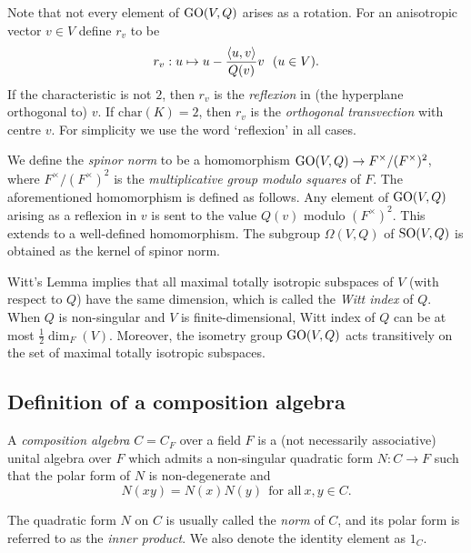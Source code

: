 Note that not every element of $\mathrm{GO}(V,Q)$ arises as a rotation. For an anisotropic
vector $v \in V$ define $r_v$ to be 
\begin{equation}
	\label{eq:reflection}
	r_v: u \mapsto u - \frac{\langle u, v \rangle}{Q(v)} v\ \ (u \in V).
\end{equation}
If the characteristic is not $2$, then $r_v$ is the \textit{reflexion} in 
(the hyperplane orthogonal to) $v$. If $\mathrm{char}(K) = 2$, then $r_v$ is the 
\textit{orthogonal transvection} with centre
$v$. For simplicity we use the word `reflexion' in all cases. 

We define the \textit{spinor norm} to be a homomorphism 
\mbox{$\mathrm{GO}(V,Q) \rightarrow F^{\times} / (F^{\times})^2$}, where $F^{\times} / (F^{\times})^2$
is the \textit{multiplicative group modulo squares} of $F$. The aforementioned homomorphism
is defined as follows. Any element of $\mathrm{GO}(V,Q)$ arising as a reflexion in
$v$ is sent to the value $Q(v)$ modulo $(F^{\times})^2$. This extends to a well-defined
homomorphism. The subgroup $\Omega(V,Q)$ of $\mathrm{SO}(V,Q)$ is obtained as the kernel of spinor norm. 

Witt's Lemma implies that all maximal totally isotropic subspaces of $V$ (with respect 
to $Q$) have the same dimension, which is called the \textit{Witt index} of $Q$. When $Q$ is
non-singular and $V$ is finite-dimensional, Witt index of $Q$ can be at most $\frac12 \dim_F(V)$. 
Moreover, the isometry group $\mathrm{GO}(V,Q)$ acts transitively on the set of maximal totally isotropic
subspaces. 

\subsection{Definition of a composition algebra}

\begin{definition}
	\label{def:composition_algebra}
	A \textit{composition algebra} $C=C_F$ over a field $F$ is a (not necessarily associative) 
	unital algebra over $F$ which admits a non-singular quadratic form $N:C \rightarrow F$
	such that the polar form of\/ $N$ is non-degenerate and 
	\begin{equation}
		N(xy) = N(x) N(y)\ \ \mbox{for all}\ x,y \in C.
	\end{equation}
\end{definition}

The quadratic form $N$ on $C$ is usually called the \textit{norm} of $C$, and its polar form
is referred to as the \textit{inner product}. We also denote the identity element as $1_C$. 


